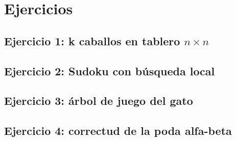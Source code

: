 \section{Ejercicios}

\subsection{Ejercicio 1: k caballos en tablero $n \times n$}

\subsection{Ejercicio 2: Sudoku con b\'usqueda local}

\subsection{Ejercicio 3: \'arbol de juego del gato}

\subsection{Ejercicio 4: correctud de la poda alfa-beta}
